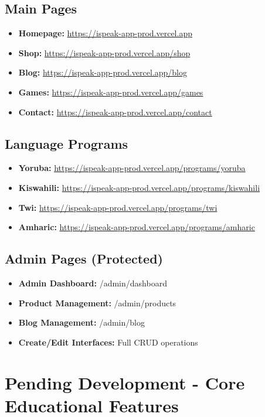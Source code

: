 \documentclass[11pt,a4paper]{article}
\begin{document}
\subsection{Main Pages}
\begin{itemize}[leftmargin=*]
    \item \textbf{Homepage:} \url{https://ispeak-app-prod.vercel.app}
    \item \textbf{Shop:} \url{https://ispeak-app-prod.vercel.app/shop}
    \item \textbf{Blog:} \url{https://ispeak-app-prod.vercel.app/blog}
    \item \textbf{Games:} \url{https://ispeak-app-prod.vercel.app/games}
    \item \textbf{Contact:} \url{https://ispeak-app-prod.vercel.app/contact}
\end{itemize}

\subsection{Language Programs}
\begin{itemize}[leftmargin=*]
    \item \textbf{Yoruba:} \url{https://ispeak-app-prod.vercel.app/programs/yoruba}
    \item \textbf{Kiswahili:} \url{https://ispeak-app-prod.vercel.app/programs/kiswahili}
    \item \textbf{Twi:} \url{https://ispeak-app-prod.vercel.app/programs/twi}
    \item \textbf{Amharic:} \url{https://ispeak-app-prod.vercel.app/programs/amharic}
\end{itemize}

\subsection{Admin Pages (Protected)}
\begin{itemize}[leftmargin=*]
    \item \textbf{Admin Dashboard:} /admin/dashboard
    \item \textbf{Product Management:} /admin/products
    \item \textbf{Blog Management:} /admin/blog
    \item \textbf{Create/Edit Interfaces:} Full CRUD operations
\end{itemize}

\section{Pending Development - Core Educational Features}
\end{document}
